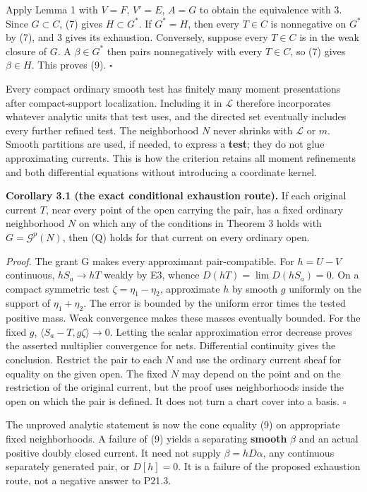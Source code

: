 \documentclass[
  11pt,
]{article}
\begin{document}
Apply Lemma 1 with \(V=F\), \(V'=E\), \(A=G\) to obtain the equivalence
with 3. Since \(G\subset C\), (7) gives \(H\subset G^*\). If \(G^*=H\),
then every \(T\in C\) is nonnegative on \(G^*\) by (7), and 3 gives its
exhaustion. Conversely, suppose every \(T\in C\) is in the weak closure
of \(G\). A \(\beta\in G^*\) then pairs nonnegatively with every
\(T\in C\), so (7) gives \(\beta\in H\). This proves (9). \(\square\)

Every compact ordinary smooth test has finitely many moment
presentations after compact-support localization. Including it in
\(\mathcal L\) therefore incorporates whatever analytic units that test
uses, and the directed set eventually includes every further refined
test. The neighborhood \(N\) never shrinks with \(\mathcal L\) or \(m\).
Smooth partitions are used, if needed, to express a \textbf{test}; they
do not glue approximating currents. This is how the criterion retains
all moment refinements and both differential equations without
introducing a coordinate kernel.

\textbf{Corollary 3.1 (the exact conditional exhaustion route).} If each
original current \(T\), near every point of the open carrying the pair,
has a fixed ordinary neighborhood \(N\) on which any of the conditions
in Theorem 3 holds with \(G=\mathcal G^p(N)\), then (Q) holds for that
current on every ordinary open.

\emph{Proof.} The grant G makes every approximant pair-compatible. For
\(h=U-V\) continuous, \(hS_a\to hT\) weakly by E3, whence
\(D(hT)=\lim D(hS_a)=0\). On a compact symmetric test
\(\zeta=\eta_1-\eta_2\), approximate \(h\) by smooth \(g\) uniformly on
the support of \(\eta_1+\eta_2\). The error is bounded by the uniform
error times the tested positive mass. Weak convergence makes these
masses eventually bounded. For the fixed \(g\),
\(\langle S_a-T,g\zeta\rangle\to0\). Letting the scalar approximation
error decrease proves the asserted multiplier convergence for nets.
Differential continuity gives the conclusion. Restrict the pair to each
\(N\) and use the ordinary current sheaf for equality on the given open.
The fixed \(N\) may depend on the point and on the restriction of the
original current, but the proof uses neighborhoods inside the open on
which the pair is defined. It does not turn a chart cover into a basis.
\(\square\)

The unproved analytic statement is now the cone equality (9) on
appropriate fixed neighborhoods. A failure of (9) yields a separating
\textbf{smooth} \(\beta\) and an actual positive doubly closed current.
It need not supply \(\beta=hD\alpha\), any continuous separately
generated pair, or \(D[h]=0\). It is a failure of the proposed
exhaustion route, not a negative answer to P21.3.
\end{document}
